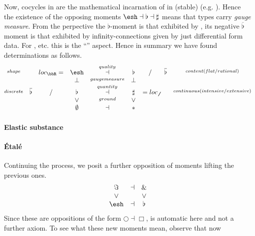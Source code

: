 \documentclass[12pt,titlepage]{article}
\newcommand{\itexarray}[1]{\begin{matrix}#1\end{matrix}}
\theoremstyle{plain}
\theoremstyle{definition}
\theoremstyle{remark}
\begin{document}
Now, cocycles in  are the mathematical incarnation of  in (stable)  (e.g. ). Hence the existence of the opposing moments $\esh  \dashv \flat \dashv \sharp$ means that types carry \emph{gauge measure}.
From the  perpective the $\flat$-moment is that exhibited by , its negative $\overline{\flat}$ moment is that exhibited by infinity-connections given by just differential form data. For ,  etc. this is the ``'' aspect.
Hence in summary we have found determinations as follows.
\begin{displaymath}
\itexarray{
\stackrel{shape}{} && loc_{\bbR} = & \esh  &\stackrel{quality}{\dashv}& \flat & / & \overline{\flat}&  \stackrel{content(flat/rational)}{}
\\
&& & \bot &\stackrel{gaugemeasure}{}& \bot
\\
\stackrel{discrete}{} &\overline{\flat}& / & \flat &\stackrel{quantity}{\dashv}& \sharp & = loc_{\not\not}  &   & \stackrel{continuous (intensive/extensive)}{}
\\
&& & \vee &\stackrel{ground}{}& \vee
\\
&& & \emptyset &\dashv& \ast &
}
\end{displaymath}
\hypertarget{elastic_substance}{}\paragraph*{{Elastic substance}}\label{elastic_substance}
\hypertarget{tal}{}\paragraph*{{Étalé}}\label{tal}
Continuing the process, we posit a further opposition of moments lifting the previous ones.
\begin{displaymath}
\itexarray{
\Im &\dashv& \&
\\
\vee && \vee
\\
\esh  &\dashv& \flat
}
\end{displaymath}
Since these are oppositions of the form $\bigcirc \dashv \Box$,  is automatic here and not a further axiom.
To see what these new moments mean, observe that now
\end{document}
